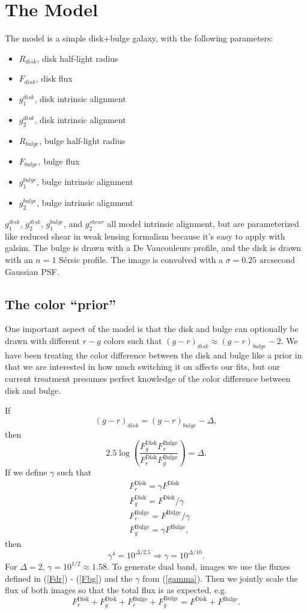 \documentclass{article}
\newcommand{\Fd}{F^\textrm{Disk}}
\newcommand{\Fb}{F^\textrm{Bulge}}
\begin{document}
\section{The Model}
The model is a simple disk+bulge galaxy, with the following parameters:
\begin{itemize}
\item $R_{disk}$, disk half-light radius
\item $F_{disk}$, disk flux
\item $g_1^{disk}$, disk intrinsic alignment
\item $g_2^{disk}$, disk intrinsic alignment
\item $R_{bulge}$, bulge half-light radius
\item $F_{bulge}$, bulge flux
\item $g_1^{bulge}$, bulge intrinsic alignment
\item $g_2^{bulge}$, bulge intrinsic alignment
\end{itemize}
$g_1^{disk}$, $g_2^{disk}$, $g_1^{bulge}$, and $g_2^{shear}$ all model
intrinsic alignment, but are parameterized like reduced shear in weak
lensing formalism because it's easy to apply with galsim.  The bulge
is drawn with a De Vaucouleurs profile, and the disk is drawn with an
$n=1$ S\'{e}rsic profile.  The image is convolved with a $\sigma = 0.25
\textrm{ arcsecond}$ Gaussian PSF.

\subsection{The color ``prior''}
One important aspect of the model is that the disk and bulge can
optionally be drawn with different $r-g$ colors such that
$(g-r)_{disk} \approx (g-r)_{bulge} - 2$.  We have
been treating the color difference between the disk and bulge like a
prior in that we are interested in how much switching it on affects
our fits, but our current treatment presumes perfect knowledge of the
color difference between disk and bulge.

If
\[
(g-r)_{disk} = (g-r)_{bulge} - \Delta,
\]
then
\[
2.5 \log \left(  \frac{F_g^\textrm{Disk} F_r^\textrm{Bulge}}
{F_r^\textrm{Disk} F_g^\textrm{Bulge}} \right) = \Delta.
\]
If we define $\gamma$ such that
\begin{align}
&\Fd_r = \gamma \Fd \label{Fdr}\\
&\Fd_g = \Fd / \gamma\\
&\Fb_r = \Fb / \gamma\\
&\Fb_g = \gamma \Fb \label{Fbg},
\end{align}
then
\begin{equation}
\gamma^4 = 10^{\Delta/2.5} \Rightarrow
 \gamma = 10^{\Delta/10}. \label{gamma}
\end{equation}
For $\Delta = 2$, $\gamma = 10^{1/2} \approx 1.58$.  To generate dual band,
images we use the fluxes defined in (\ref{Fdr}) - (\ref{Fbg}) and the $\gamma$
from (\ref{gamma}).  Then we jointly scale the flux of both images so that the
total flux is as expected, e.g.
\[
\Fd_r + \Fd_g + \Fb_r + \Fb_g = \Fd + \Fb.
\]
\end{document}
